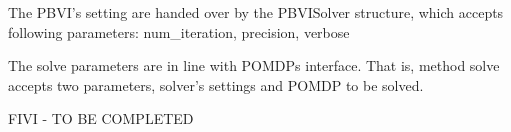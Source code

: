 The PBVI's setting are handed over by the PBVISolver structure, which accepts following parameters:
num\_iteration, precision, verbose

The solve parameters are in line with POMDPs interface. That is, method solve accepts two parameters, solver's settings and POMDP to be solved. 


FIVI - TO BE COMPLETED 

















